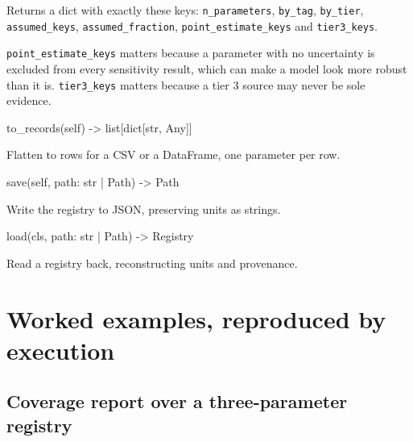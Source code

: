 \documentclass[10pt,a4paper,twoside]{report}
\begin{document}
Returns a dict with exactly these keys: \texttt{n\_parameters}, \texttt{by\_tag}, \texttt{by\_tier}, \texttt{assumed\_keys}, \texttt{assumed\_fraction}, \texttt{point\_estimate\_keys} and \texttt{tier3\_keys}.

\texttt{point\_estimate\_keys} matters because a parameter with no uncertainty is excluded from every sensitivity result, which can make a model look more robust than it is. \texttt{tier3\_keys} matters because a tier 3 source may never be sole evidence.

\begin{verbatimsmall}
to_records(self) -> list[dict[str, Any]]
\end{verbatimsmall}

Flatten to rows for a CSV or a DataFrame, one parameter per row.

\begin{verbatimsmall}
save(self, path: str | Path) -> Path
\end{verbatimsmall}

Write the registry to JSON, preserving units as strings.

\begin{verbatimsmall}
load(cls, path: str | Path) -> Registry
\end{verbatimsmall}

Read a registry back, reconstructing units and provenance.

\section{Worked examples, reproduced by execution}

\subsection*{Coverage report over a three-parameter registry}
\end{document}

